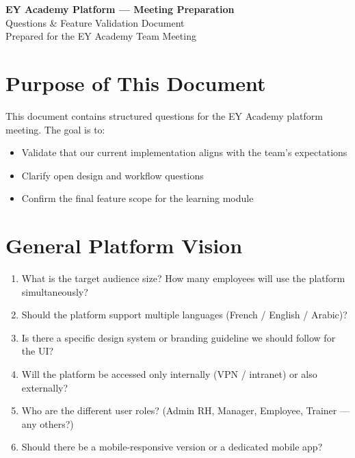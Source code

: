 \documentclass[11pt,a4paper]{article}
\begin{document}
\begin{center}
  {\LARGE\bfseries\color{eyblue} EY Academy Platform --- Meeting Preparation}\\[0.5em]
  {\large\color{eygray} Questions \& Feature Validation Document}\\[0.3em]
  {\small\color{eygray} Prepared for the EY Academy Team Meeting}
\end{center}

\vspace{1.5em}

\section{Purpose of This Document}

This document contains structured questions for the EY Academy platform meeting. The goal is to:
\begin{itemize}[nosep]
  \item Validate that our current implementation aligns with the team's expectations
  \item Clarify open design and workflow questions
  \item Confirm the final feature scope for the learning module
\end{itemize}

\section{General Platform Vision}

\begin{enumerate}[leftmargin=2em]
  \item What is the target audience size? How many employees will use the platform simultaneously?
  \item Should the platform support multiple languages (French / English / Arabic)?
  \item Is there a specific design system or branding guideline we should follow for the UI?
  \item Will the platform be accessed only internally (VPN / intranet) or also externally?
  \item Who are the different user roles? (Admin RH, Manager, Employee, Trainer --- any others?)
  \item Should there be a mobile-responsive version or a dedicated mobile app?
\end{enumerate}
\end{document}
